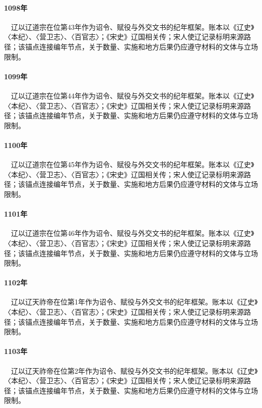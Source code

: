 \paragraph{1098年}　辽以辽道宗在位第43年作为诏令、赋役与外交文书的纪年框架。账本以《辽史》〈本纪〉、〈营卫志〉、〈百官志〉；《宋史》辽国相关传；宋人使辽记录标明来源路径；该锚点连接编年节点，关于数量、实施和地方后果仍应遵守材料的文体与立场限制。

\paragraph{1099年}　辽以辽道宗在位第44年作为诏令、赋役与外交文书的纪年框架。账本以《辽史》〈本纪〉、〈营卫志〉、〈百官志〉；《宋史》辽国相关传；宋人使辽记录标明来源路径；该锚点连接编年节点，关于数量、实施和地方后果仍应遵守材料的文体与立场限制。

\paragraph{1100年}　辽以辽道宗在位第45年作为诏令、赋役与外交文书的纪年框架。账本以《辽史》〈本纪〉、〈营卫志〉、〈百官志〉；《宋史》辽国相关传；宋人使辽记录标明来源路径；该锚点连接编年节点，关于数量、实施和地方后果仍应遵守材料的文体与立场限制。

\paragraph{1101年}　辽以辽道宗在位第46年作为诏令、赋役与外交文书的纪年框架。账本以《辽史》〈本纪〉、〈营卫志〉、〈百官志〉；《宋史》辽国相关传；宋人使辽记录标明来源路径；该锚点连接编年节点，关于数量、实施和地方后果仍应遵守材料的文体与立场限制。

\paragraph{1102年}　辽以辽天祚帝在位第1年作为诏令、赋役与外交文书的纪年框架。账本以《辽史》〈本纪〉、〈营卫志〉、〈百官志〉；《宋史》辽国相关传；宋人使辽记录标明来源路径；该锚点连接编年节点，关于数量、实施和地方后果仍应遵守材料的文体与立场限制。

\paragraph{1103年}　辽以辽天祚帝在位第2年作为诏令、赋役与外交文书的纪年框架。账本以《辽史》〈本纪〉、〈营卫志〉、〈百官志〉；《宋史》辽国相关传；宋人使辽记录标明来源路径；该锚点连接编年节点，关于数量、实施和地方后果仍应遵守材料的文体与立场限制。

